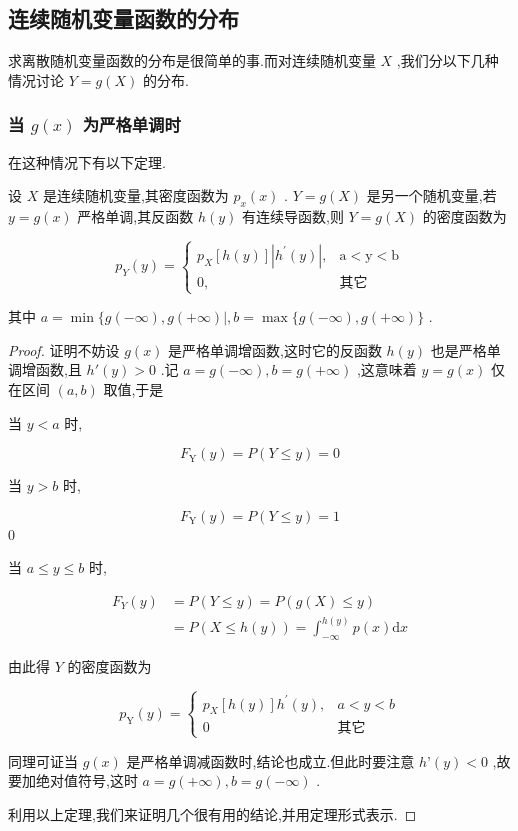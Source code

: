 \subsection{连续随机变量函数的分布}

求离散随机变量函数的分布是很简单的事.而对连续随机变量 $ X $ ,我们分以下几种情况讨论 $ Y=g(X) $ 的分布.

\subsubsection{当 $ g(x) $ 为严格单调时}

在这种情况下有以下定理.

\begin{theorem}{}{}
	设 $ X $ 是连续随机变量,其密度函数为 $ p_{x}(x) $ . $ Y=g(X) $ 是另一个随机变量,若 $ y=g(x) $ 严格单调,其反函数 $ h(y) $ 有连续导函数,则 $ Y=g(X) $ 的密度函数为
	
	\begin{equation}
	p_{Y}(y)=\left\{
	\begin{array}{ll}
	{p_{X}[h(y)]\left|h^{\prime}(y)\right|,} & { \mathrm{a}<\mathrm{y}<\mathrm{b}} \\ 
	{0,} & {\text{其它}}
	\end{array}\right. \label{eq:2.6.1}
	\end{equation}
	
	其中 $ a=\min \{g(-\infty), g(+\infty) |, b=\max \{g(-\infty), g(+\infty)\} $ .
\end{theorem}

\begin{proof}
	证明不妨设 $ g(x) $ 是严格单调增函数,这时它的反函数 $ h(y) $ 也是严格单调增函数,且 $ h'(y)>0 $ .记 $ a=g(-\infty), b=g(+\infty) $ ,这意味着 $ y=g(x) $ 仅在区间 $ (a,b) $ 取值,于是
	
	当 $ y<a $ 时,
	
	\[
	F_{\mathrm{Y}}(y)=P(Y \leqslant y)=0
	\]
	
	当 $ y>b $ 时,
	
	\[
	F_{\mathrm{Y}}(y)=P(Y \leqslant y)=1
	\]0
	
	当 $ a \leqslant y \leqslant b $ 时,
	
	\[
	\begin{aligned} F_{Y}(y) &=P(Y \leqslant y)=P(g(X) \leqslant y) \\ &=P(X \leqslant h(y))=\int_{-\infty}^{h(y)} p(x) \mathrm{d} x \end{aligned}
	\]
	
	由此得 $ Y $ 的密度函数为
	
	\[
	p_{\mathrm{Y}}(y)=\left\{
	\begin{array}{ll}
	{p_{X}[h(y)] h^{\prime}(y), } & {a<y<b} \\ 
	{0} & {\text{其它}}
	\end{array}\right.
	\]
	
	同理可证当 $ g(x) $ 是严格单调减函数时,结论也成立.但此时要注意 $ h’(y)<0 $ ,故要加绝对值符号,这时 $ a=g(+\infty), b=g(-\infty) $ .
	
	利用以上定理,我们来证明几个很有用的结论,并用定理形式表示.
\end{proof}

